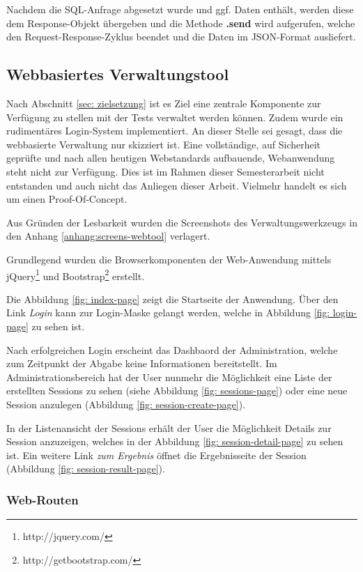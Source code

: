 Nachdem die SQL-Anfrage abgesetzt wurde und ggf. Daten enthält, werden diese dem Response-Objekt übergeben und die Methode \textbf{.send} wird aufgerufen, welche den Request-Response-Zyklus beendet und die Daten im JSON-Format ausliefert. 

\subsection{Webbasiertes Verwaltungstool \label{sec:webtool}}

\label{sec:web_verwaltung}
Nach Abschnitt \ref{sec: zielsetzung} ist es Ziel eine zentrale Komponente zur Verfügung zu stellen mit der Tests verwaltet werden können. 
Zudem wurde ein rudimentäres Login-System implementiert. 
An dieser Stelle sei gesagt, dass die webbasierte Verwaltung nur skizziert ist. 
Eine vollständige, auf Sicherheit geprüfte und nach allen heutigen Webstandards aufbauende, Webanwendung steht nicht zur Verfügung. 
Dies ist im Rahmen dieser Semesterarbeit nicht entstanden und auch nicht das Anliegen dieser Arbeit. 
Vielmehr handelt es sich um einen Proof-Of-Concept. 

Aus Gründen der Lesbarkeit wurden die Screenshots des Verwaltungswerkzeugs in den Anhang \ref{anhang:screens-webtool} verlagert. 

Grundlegend wurden die Browserkomponenten der Web-Anwendung mittels jQuery\footnote{http://jquery.com/} und Bootstrap\footnote{http://getbootstrap.com/} erstellt.

Die Abbildung \ref{fig: index-page} zeigt die Startseite der Anwendung. 
Über den Link \emph{Login} kann zur Login-Maske gelangt werden, welche in Abbildung \ref{fig: login-page} zu sehen ist. 

Nach erfolgreichen Login erscheint das Dashbaord der Administration, welche zum Zeitpunkt der Abgabe keine Informationen bereitstellt. 
Im Administrationsbereich hat der User nunmehr die Möglichkeit eine Liste der erstellten Sessions zu sehen (siehe Abbildung \ref{fig: sessions-page}) oder eine neue Session anzulegen (Abbildung \ref{fig: session-create-page}). 

In der Listenansicht der Sessions erhält der User die Möglichkeit Details zur Session anzuzeigen, welches in der Abbildung \ref{fig: session-detail-page} zu sehen ist. 
Ein weitere Link \emph{zum Ergebnis} öffnet die Ergebnisseite der Session (Abbildung \ref{fig: session-result-page}).

\subsubsection{Web-Routen}

